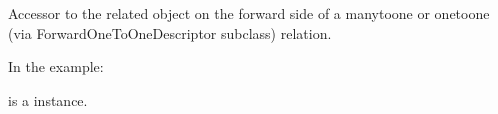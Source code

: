 \documentclass[letterpaper,10pt,spanish]{sphinxmanual}
\begin{document}
\begin{fulllineitems}
\begin{fulllineitems}
\end{fulllineitems}



\begin{fulllineitems}

\pysigstartsignatures
{}
\pysigstopsignatures
\sphinxAtStartPar
Accessor to the related object on the forward side of a many\sphinxhyphen{}to\sphinxhyphen{}one or
one\sphinxhyphen{}to\sphinxhyphen{}one (via ForwardOneToOneDescriptor subclass) relation.

\sphinxAtStartPar
In the example:

\begin{sphinxVerbatim}[commandchars=\\\{\}]
 
       
\end{sphinxVerbatim}

\sphinxAtStartPar
{} is a  instance.

\end{fulllineitems}



\begin{fulllineitems}

\pysigstartsignatures
{}
\pysigstopsignatures
\end{fulllineitems}


\end{fulllineitems}
\end{document}

